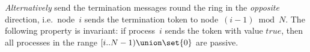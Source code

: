 \begin{answer}
\begin{enumerate}
\emph{Alternatively} send the termination messages round the ring in the
\emph{opposite} direction, i.e.~node~$i$ sends the termination token to
node~$(i-1) \bmod N$.   The following property is invariant: if process~$i$
sends the token with value $true$, then all processes in the range $[i ..
N-1) \union \set{0}$ are passive.



\end{enumerate}
\end{answer}
